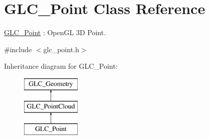 \hypertarget{class_g_l_c___point}{\section{G\-L\-C\-\_\-\-Point Class Reference}
\label{class_g_l_c___point}
}


\hyperlink{class_g_l_c___point}{G\-L\-C\-\_\-\-Point} \-: Open\-G\-L 3\-D Point.  




{\ttfamily \#include $<$glc\-\_\-point.\-h$>$}

Inheritance diagram for G\-L\-C\-\_\-\-Point\-:\begin{figure}[H]
\begin{center}
\leavevmode
\includegraphics[height=3.000000cm]{class_g_l_c___point}
\end{center}
\end{figure}
